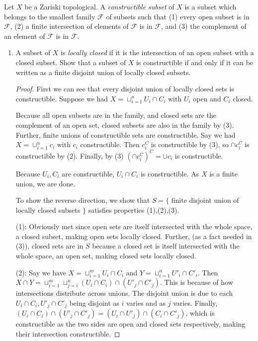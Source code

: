 \begin{exercise}
    Let $X$ be a Zariski topological. A \textit{constructible subset} of $X$ is a subset which belongs to the smallest family $\mathcal{F}$ of subsets such that (1) every open subset is in $\mathcal{F}$, (2) a finite intersection of elements of $\mathcal{F}$ is in $\mathcal{F}$, and (3) the complement of an element of $\mathcal{F}$ is in $\mathcal{F}$.
    \begin{enumerate}
        \item A subset of $X$ is \textit{locally closed} if it is the intersection of an open subset with a closed subset. Show that a subset of $X$ is constructible if and only if it can be written as a finite disjoint union of locally closed subsets.
        \begin{proof}
            First we can see that every disjoint union of locally closed sets is constructible.
            Suppose we had $X = \sqcup_{i=1}^n U_i\cap C_i$ with $U_i$ open and $C_i$ closed.
            
            Because all open subsets are in the family, and closed sets are the complement of an open set, closed subsets are also in the family by (3).
            Further, finite unions of constructible sets are constructible.
            Say we had $X = \cup_{i=1}^n c_i$ with $c_i$ constructible.
            Then $c_i^C$ is constructible by (3), so $\cap c_i^C$ is constructible by (2).
            Finally, by (3) $(\cap c_i^C)^C = \cup c_i$ is constructible.

            Because $U_i,C_i$ are constructible, $U_i\cap C_i$ is constructible.
            As $X$ is a finite union, we are done.

            To show the reverse direction, we show that $S = \{$ finite disjoint union of locally closed subsets $\}$ satisfies properties (1),(2),(3).

            (1): Obviously met since open sets are itself intersected with the whole space, a closed subset, making open sets locally closed.
            Further, (as a fact needed in (3)), closed sets are in $S$ because a closed set is itself intersected with the whole space, an open set, making closed sets locally closed.

            (2): Say we have $X=\sqcup_{i= 1}^m U_i\cap C_i$ and $Y = \sqcup_{i=1}^n U'_i\cap C'_i$.
            Then $X\cap Y = \sqcup_{i=1}^m\sqcup_{j=i}^n (U_i\cap C_i)\cap (U'_j \cap C'_j)$.
            This is because of how intersections distribute across unions.
            The disjoint union is due to each $U_i\cap C_i, U'_j\cap C'_j$ being disjoint as $i$ varies and as $j$ varies.
            Finally, $(U_i \cap C_i)\cap (U'_j \cap C'_j) = (U_i\cap U'_j) \cap (C_i\cap C'_j)$, which is constructible as the two sides are open and closed sets respectively, making their intersection constructible.


\end{proof}
\end{enumerate}
\end{exercise}
